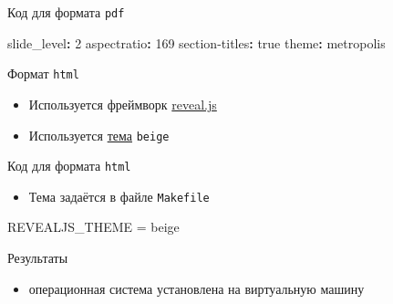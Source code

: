 \documentclass[
  ignorenonframetext,
  aspectratio=169,
]{beamer}
\newenvironment{Shaded}{\begin{snugshade}}{\end{snugshade}}
\newcommand{\AttributeTok}[1]{\textcolor[rgb]{0.40,0.45,0.13}{#1}}
\newcommand{\CharTok}[1]{\textcolor[rgb]{0.13,0.47,0.30}{#1}}
\newcommand{\DecValTok}[1]{\textcolor[rgb]{0.68,0.00,0.00}{#1}}
\newcommand{\FunctionTok}[1]{\textcolor[rgb]{0.28,0.35,0.67}{#1}}
\newcommand{\KeywordTok}[1]{\textcolor[rgb]{0.00,0.23,0.31}{\textbf{#1}}}
\newcommand{\NormalTok}[1]{\textcolor[rgb]{0.00,0.23,0.31}{#1}}
\providecommand{\tightlist}{%
  \setlength{\itemsep}{0pt}\setlength{\parskip}{0pt}}\usepackage{longtable,booktabs,array}
\begin{document}
\begin{frame}[fragile]{Код для формата \texttt{pdf}}
\label{ux43aux43eux434-ux434ux43bux44f-ux444ux43eux440ux43cux430ux442ux430-pdf}
\begin{Shaded}
\begin{Highlighting}[]
\FunctionTok{slide\_level}\KeywordTok{:}\AttributeTok{ }\DecValTok{2}
\FunctionTok{aspectratio}\KeywordTok{:}\AttributeTok{ }\DecValTok{169}
\FunctionTok{section{-}titles}\KeywordTok{:}\AttributeTok{ }\CharTok{true}
\FunctionTok{theme}\KeywordTok{:}\AttributeTok{ metropolis}
\end{Highlighting}
\end{Shaded}
\end{frame}

\begin{frame}[fragile]{Формат \texttt{html}}
\label{ux444ux43eux440ux43cux430ux442-html}
\begin{itemize}[<+->]
\tightlist
\item
  Используется фреймворк \href{https://revealjs.com/}{reveal.js}
\item
  Используется \href{https://revealjs.com/themes/}{тема} \texttt{beige}
\end{itemize}
\end{frame}

\begin{frame}[fragile]{Код для формата \texttt{html}}
\label{ux43aux43eux434-ux434ux43bux44f-ux444ux43eux440ux43cux430ux442ux430-html}
\begin{itemize}[<+->]
\tightlist
\item
  Тема задаётся в файле \texttt{Makefile}
\end{itemize}

\begin{Shaded}
\begin{Highlighting}[]
\NormalTok{REVEALJS\_THEME = beige}
\end{Highlighting}
\end{Shaded}
\end{frame}

\begin{frame}{Результаты}
\label{ux440ux435ux437ux443ux43bux44cux442ux430ux442ux44b}
\begin{itemize}[<+->]
\tightlist
\item
  операционная система установлена на виртуальную машину
\end{itemize}
\end{frame}
\end{document}
